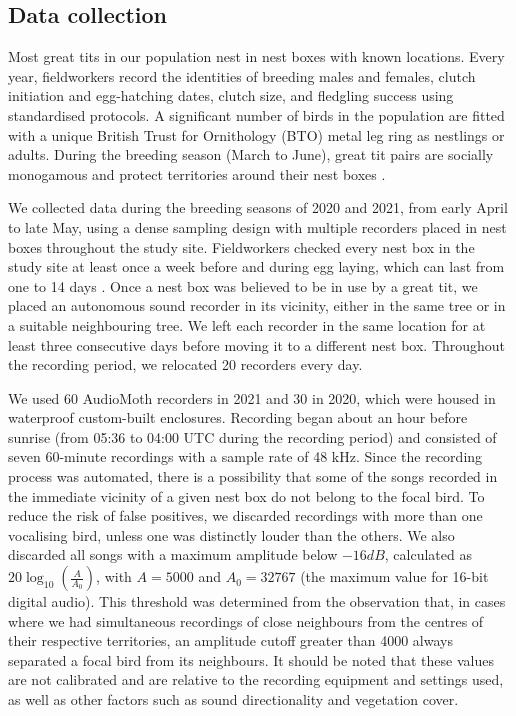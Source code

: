 \subsection{Data collection}
Most great tits in our population nest in nest boxes with known locations. Every year, fieldworkers record the identities of breeding males and females, clutch initiation and egg-hatching dates, clutch size, and fledgling success using standardised protocols. A significant number of birds in the population are fitted with a unique British Trust for Ornithology (BTO) metal leg ring as nestlings or adults. During the breeding season (March to June), great tit pairs are socially monogamous and protect territories around their nest boxes \parencite{hinde1952}.

We collected data during the breeding seasons of 2020 and 2021, from early April to late May, using a dense sampling design with multiple recorders placed in nest boxes throughout the study site. Fieldworkers checked every nest box in the study site at least once a week before and during egg laying, which can last from one to 14 days \parencite{Perrins1965}. Once a nest box was believed to be in use by a great tit, we placed an autonomous sound recorder in its vicinity, either in the same tree or in a suitable neighbouring tree. We left each recorder in the same location for at least three consecutive days before moving it to a different nest box. Throughout the recording period, we relocated 20 recorders every day.

We used 60 AudioMoth recorders \parencite{hill2019} in 2021 and 30 in 2020, which were housed in waterproof custom-built enclosures. Recording began about an hour before sunrise (from 05:36 to 04:00 UTC during the recording period) and consisted of seven 60-minute recordings with a sample rate of 48 kHz. Since the recording process was automated, there is a possibility that some of the songs recorded in the immediate vicinity of a given nest box do not belong to the focal bird. To reduce the risk of false positives, we discarded recordings with more than one vocalising bird, unless one was distinctly louder than the others. We also discarded all songs with a maximum amplitude below $-16 dB$, calculated as $20\log_{10} \left (\frac{A}{A_{0}}\right )$, with $A = 5000$ and $A_{0} = 32767$ (the maximum value for 16-bit digital audio). This threshold was determined from the observation that, in cases where we had simultaneous recordings of close neighbours from the centres of their respective territories, an amplitude cutoff greater than 4000 always separated a focal bird from its neighbours. It should be noted that these values are not calibrated and are relative to the recording equipment and settings used, as well as other factors such as sound directionality and vegetation cover.

